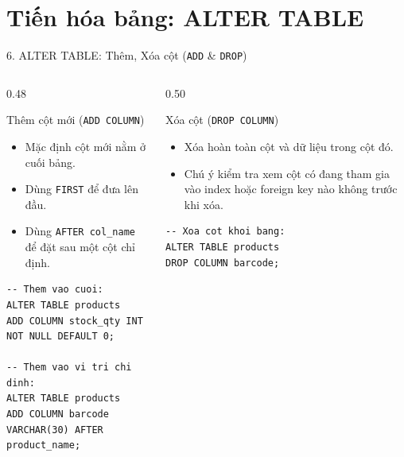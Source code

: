 \documentclass[aspectratio=169,11pt]{beamer}
\begin{document}
\section{Tiến hóa bảng: ALTER TABLE}
\begin{frame}[fragile]{6. ALTER TABLE: Thêm, Xóa cột (\texttt{ADD} \& \texttt{DROP})}
\begin{columns}[t]
  \begin{column}{0.48\textwidth}
    \begin{block}{Thêm cột mới (\texttt{ADD COLUMN})}
      \begin{itemize}\setlength{\itemsep}{1.5pt}
        \item Mặc định cột mới nằm ở cuối bảng.
        \item Dùng \texttt{FIRST} để đưa lên đầu.
        \item Dùng \texttt{AFTER col\_name} để đặt sau một cột chỉ định.
      \end{itemize}
    \end{block}
\begin{lstlisting}
-- Them vao cuoi:
ALTER TABLE products
ADD COLUMN stock_qty INT NOT NULL DEFAULT 0;

-- Them vao vi tri chi dinh:
ALTER TABLE products
ADD COLUMN barcode VARCHAR(30) AFTER product_name;
\end{lstlisting}
  \end{column}
  \begin{column}{0.50\textwidth}
    \begin{block}{Xóa cột (\texttt{DROP COLUMN})}
      \begin{itemize}\setlength{\itemsep}{1.5pt}
        \item Xóa hoàn toàn cột và dữ liệu trong cột đó.
        \item Chú ý kiểm tra xem cột có đang tham gia vào index hoặc foreign key nào không trước khi xóa.
      \end{itemize}
    \end{block}
\begin{lstlisting}
-- Xoa cot khoi bang:
ALTER TABLE products
DROP COLUMN barcode;
\end{lstlisting}
  \end{column}
\end{columns}
\end{frame}
\end{document}
